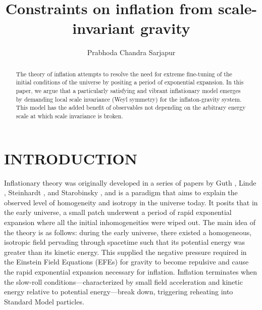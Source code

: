\documentclass[aps,prd,reprint,preprintnumbers,showpacs,floatfix,nofootinbib,superscript address]{revtex4-2}
\begin{document}
\title{Constraints on inflation from scale-invariant gravity}

\author{Prabhoda Chandra Sarjapur}

\begin{abstract}
The theory of inflation attempts to resolve the need for extreme fine-tuning of the initial conditions of the universe by positing a period of exponential expansion. In this paper, we argue that a particularly satisfying and vibrant inflationary model emerges by demanding local scale invariance (Weyl symmetry) for the inflaton-gravity system. This model has the added benefit of observables not depending on the arbitrary energy scale at which scale invariance is broken.
\end{abstract}

\maketitle
\section{INTRODUCTION} \label{Introduction}
\indent Inflationary theory was originally developed in a series of papers by Guth \cite{GuthOriginalPaper}, Linde \cite{LINDE1982389}, Steinhardt 
\cite{PhysRevLett.48.1220}, and Starobinsky \cite{STAROBINSKY198099}, and is a paradigm that aims to explain the observed level of homogeneity and isotropy in the universe today. It posits that in the early universe, a small patch underwent a period of rapid exponential expansion where all the initial inhomogeneities were wiped out. The main idea of the theory is as follows: during the early universe, there existed a homogeneous, isotropic field pervading through spacetime such that its potential energy was greater than its kinetic energy. This supplied the negative pressure required in the Einstein Field Equations (EFEs) for gravity to become repulsive and cause the rapid exponential expansion necessary for inflation. Inflation terminates when the slow-roll conditions—characterized by small field acceleration and kinetic energy relative to potential energy—break down, triggering reheating into Standard Model particles.
\end{document}

